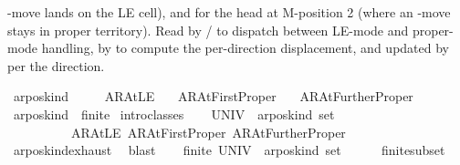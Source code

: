 \begin{isabellebody}
\begin{isamarkuptext}
  -move lands on the LE cell), and
   for the head at M-position
  \isa{{\isasymge}} 2 (where an -move stays in proper
  territory).  Read by  / 
  to dispatch between LE-mode and proper-mode handling, by
   to compute the per-direction
  displacement, and updated by  per the
  direction.%
\end{isamarkuptext}\isamarkuptrue%
\isamarkupfalse%
\ ar{\isacharunderscore}{\kern0pt}pos{\isacharunderscore}{\kern0pt}kind\ {\isacharequal}{\kern0pt}\isanewline
\ \ \ \ AR{\isacharunderscore}{\kern0pt}AtLE\isanewline
\ \ {\isacharbar}{\kern0pt}\ AR{\isacharunderscore}{\kern0pt}AtFirstProper\isanewline
\ \ {\isacharbar}{\kern0pt}\ AR{\isacharunderscore}{\kern0pt}AtFurtherProper\isanewline
\isanewline
{}\isamarkupfalse%
\ ar{\isacharunderscore}{\kern0pt}pos{\isacharunderscore}{\kern0pt}kind\ {\isacharcolon}{\kern0pt}{\isacharcolon}{\kern0pt}\ finite\isanewline
%
\isadelimproof
%
\endisadelimproof
%
\isatagproof
{}\isamarkupfalse%
\ {\isacharparenleft}{\kern0pt}intro{\isacharunderscore}{\kern0pt}classes{\isacharparenright}{\kern0pt}\isanewline
\ \ \isamarkupfalse%
\ {\isachardoublequoteopen}{\isacharparenleft}{\kern0pt}UNIV\ {\isacharcolon}{\kern0pt}{\isacharcolon}{\kern0pt}\ ar{\isacharunderscore}{\kern0pt}pos{\isacharunderscore}{\kern0pt}kind\ set{\isacharparenright}{\kern0pt}\ {\isasymsubseteq}\isanewline
\ \ \ \ \ \ \ \ \ \ {\isacharbraceleft}{\kern0pt}AR{\isacharunderscore}{\kern0pt}AtLE{\isacharcomma}{\kern0pt}\ AR{\isacharunderscore}{\kern0pt}AtFirstProper{\isacharcomma}{\kern0pt}\ AR{\isacharunderscore}{\kern0pt}AtFurtherProper{\isacharbraceright}{\kern0pt}{\isachardoublequoteclose}\isanewline
\ \ \ \ \isamarkupfalse%
\ ar{\isacharunderscore}{\kern0pt}pos{\isacharunderscore}{\kern0pt}kind{\isachardot}{\kern0pt}exhaust\ \isamarkupfalse%
\ blast\isanewline
\ \ \isamarkupfalse%
\ {\isachardoublequoteopen}finite\ {\isacharparenleft}{\kern0pt}UNIV\ {\isacharcolon}{\kern0pt}{\isacharcolon}{\kern0pt}\ ar{\isacharunderscore}{\kern0pt}pos{\isacharunderscore}{\kern0pt}kind\ set{\isacharparenright}{\kern0pt}{\isachardoublequoteclose}\isanewline
\ \ \ \ \isamarkupfalse%
\ finite{\isacharunderscore}{\kern0pt}subset\ \isamarkupfalse%

\end{isabellebody}
